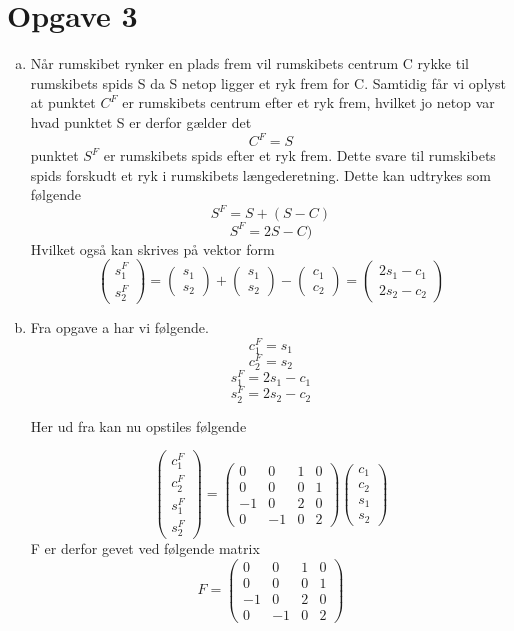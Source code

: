 \documentclass[12pt]{article}
\begin{document}
\section{Opgave 3}
\begin{enumerate}[(a)]
\item
Når rumskibet rynker en plads frem vil rumskibets centrum C rykke til rumskibets
spids S da S netop ligger et ryk frem for C.
Samtidig får vi oplyst at punktet $C^F$ er rumskibets centrum efter et ryk frem,
hvilket jo netop var hvad punktet S er derfor gælder det 
$$C^F = S$$
punktet $S^F$ er rumskibets spids efter et ryk frem. Dette svare til rumskibets
spids forskudt et ryk i rumskibets længederetning. Dette kan udtrykes
som følgende
$$ S^F = S + (S - C)$$
$$ S^F = 2S - C)$$
Hvilket også kan skrives på vektor form
$$ \left(\begin{array}{c}
s_1^F\\
s_2^F
\end{array}\right) =
 \left(\begin{array}{c}
s_1\\
s_2
\end{array}\right) +
 \left(\begin{array}{c}
s_1\\
s_2
\end{array}\right) - 
 \left(\begin{array}{c}
c_1\\
c_2
\end{array}\right) = 
 \left(\begin{array}{c}
2s_1-c_1\\
2s_2-c_2
\end{array}\right)
$$
\item
Fra opgave a har vi følgende.
$$c^F_1 = s_1$$
$$c^F_2 = s_2$$
$$s^F_1 = 2s_1-c_1$$
$$s^F_2 = 2s_2-c_2$$

Her ud fra kan nu opstiles følgende

$$
\left(\begin{array}{c}
c_1^F\\
c_2^F\\
s_1^F\\
s_2^F
\end{array}\right)
 = \left(\begin{array}{cccc}
0&0&1&0\\
0&0&0&1\\
-1&0&2&0\\
0&-1&0&2
\end{array}\right)
\left(\begin{array}{c}
c_1\\
c_2\\
s_1\\
s_2
\end{array}\right)
$$
F er derfor gevet ved følgende matrix
$$ F  = \left(\begin{array}{cccc}
0&0&1&0\\
0&0&0&1\\
-1&0&2&0\\
0&-1&0&2
\end{array}\right)
$$


\end{enumerate}
\end{document}

